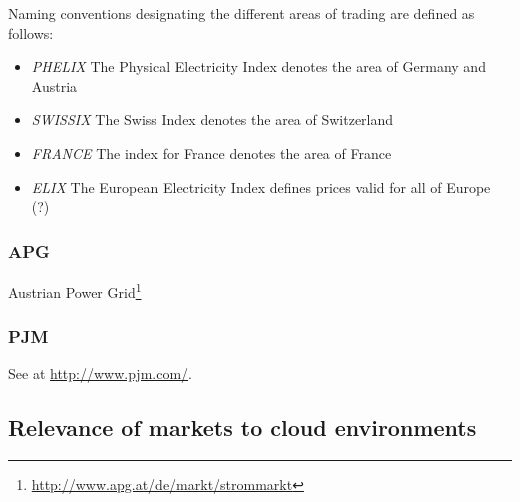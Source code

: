 Naming conventions designating the different areas of trading are defined as follows: 

\begin{itemize}

\item \emph{PHELIX} The Physical Electricity Index denotes the area of Germany and Austria

\item \emph{SWISSIX} The Swiss Index denotes the area of Switzerland

\item \emph{FRANCE} The index for France denotes the area of France

\item \emph{ELIX} The European Electricity Index defines prices valid for all of Europe (?)

\end{itemize}


\subsubsection{APG}

Austrian Power Grid\footnote{\url{http://www.apg.at/de/markt/strommarkt}}



\subsubsection{PJM}

See at \url{http://www.pjm.com/}. 




\subsection{Relevance of markets to cloud environments}


